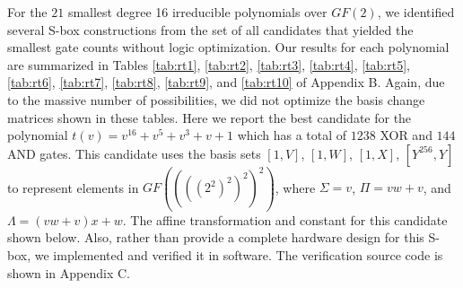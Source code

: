 For the $21$ smallest degree 16 irreducible polynomials over $GF(2)$, we identified several S-box constructions from the set of all candidates that yielded the smallest gate counts without logic optimization. Our results for each polynomial are summarized in Tables \ref{tab:rt1}, \ref{tab:rt2}, \ref{tab:rt3}, \ref{tab:rt4}, \ref{tab:rt5}, \ref{tab:rt6}, \ref{tab:rt7}, \ref{tab:rt8}, \ref{tab:rt9}, and \ref{tab:rt10} of Appendix B. Again, due to the massive number of possibilities, we did not optimize the basis change matrices shown in these tables. Here we report the best candidate for the polynomial $t(v) = v^{16} + v^5 + v^3 + v + 1$ which has a total of $1238$ XOR and $144$ AND gates. This candidate uses the basis sets $[1, V]$, $[1, W]$, $[1, X]$, $[Y^{256}, Y]$ to represent elements in $GF((((2^2)^2)^2)^2)$, where $\Sigma = v$, $\Pi = vw + v$, and $\Lambda = (vw + v)x + w$. The affine transformation and constant for this candidate shown below. Also, rather than provide a complete hardware design for this S-box, we implemented and verified it in software. The verification source code is shown in Appendix C. 



